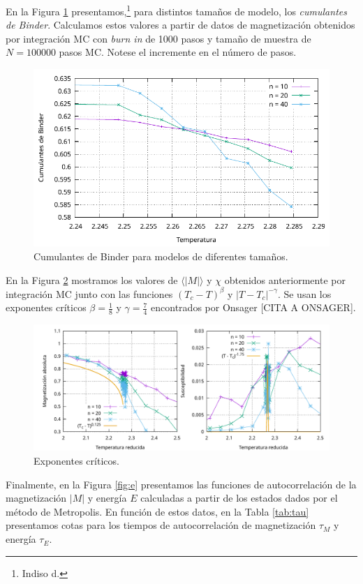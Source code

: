 \documentclass[a4paper,12pt]{article}
\begin{document}
En la Figura \ref{fig:d} presentamos,\footnote{Indiso d.} para distintos tamaños de modelo, los {\it cumulantes de Binder}. Calculamos estos valores a partir de datos de magnetización obtenidos por integración MC con {\it burn in} de 1000 pasos y tamaño de muestra de $N = 100000$ pasos MC. Notese el incremente en el número de pasos.

\begin{figure}[h!]
    \centering
    \includegraphics[width = .8\textwidth]{../img/d.pdf}
    \caption{Cumulantes de Binder para modelos de diferentes tamaños.}
    \label{fig:d}
\end{figure}

En la Figura \ref{fig:d_bis} mostramos los valores de $\langle |M| \rangle$ y $\chi$ obtenidos anteriormente por integración MC junto con las funciones $(T_c - T)^\beta$ y $|T - T_c|^{-\gamma}$. Se usan los exponentes críticos $\beta = \frac{1}{8}$ y $\gamma = \frac{7}{4}$ encontrados por Onsager [CITA A ONSAGER].

\begin{figure}[h!]
    \centering
    \includegraphics[width = \textwidth]{../img/d_bis.pdf}
    \caption{Exponentes críticos.}
    \label{fig:d_bis}
\end{figure}

Finalmente, en la Figura \ref{fig:e} presentamos las funciones de autocorrelación de la magnetización $|M|$ y energía $E$ calculadas a partir de los estados dados por el método de Metropolis. En función de estos datos, en la Tabla \ref{tab:tau} presentamos cotas para los tiempos de autocorrelación de magnetización $\tau_M$ y energía $\tau_E$.
\end{document}

